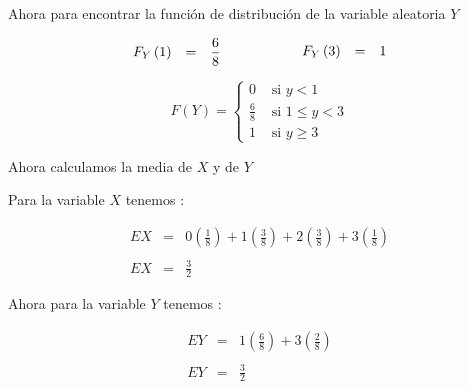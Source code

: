 \documentclass[12pt]{article}
\begin{document}
\begin{flushleft}
    Ahora para encontrar la funci\'on de distribuci\'on de la variable aleatoria $Y$
\end{flushleft}


\begin{equation*}
    \begin{array}{cp{1cm}c}
        \begin{array}{ccc}
            F_{Y} \left(1\right) & = & \displaystyle \frac{6}{8}
        \end{array}
         &
         &
        \begin{array}{ccc}
            F_{Y} \left(3\right) & = & 1
        \end{array}
    \end{array}
\end{equation*}

\begin{equation*}
    F\left(Y\right) = \begin{cases}
        0           & \mbox{ si   $y < 1 $}
        \\
        \frac{6}{8} & \mbox{ si   $1\leq y < 3$}
        \\
        1           & \mbox{ si   $y\geq 3$}
    \end{cases}
\end{equation*}

\begin{flushleft}
    Ahora calculamos la media de $X$ y de $Y$
\end{flushleft}

\begin{flushleft}
    Para la variable $X$ tenemos :
\end{flushleft}

\begin{equation*}
    \begin{array}{rcl}
        EX & = & \displaystyle 0 \left(\frac{1}{8}\right) + 1 \left(\frac{3}{8}\right) + 2 \left(\frac{3}{8}\right) + 3 \left(\frac{1}{8}\right)
        \\
        \\
        EX & = & \displaystyle \frac{3}{2}
    \end{array}
\end{equation*}

\begin{flushleft}
    Ahora para la variable $Y$ tenemos :
\end{flushleft}

\begin{equation*}
    \begin{array}{rcl}
        EY & = & \displaystyle 1 \left(\frac{6}{8}\right) + 3 \left(\frac{2}{8}\right)
        \\
        \\
        EY & = & \displaystyle \frac{3}{2}
    \end{array}
\end{equation*}
\end{document}
